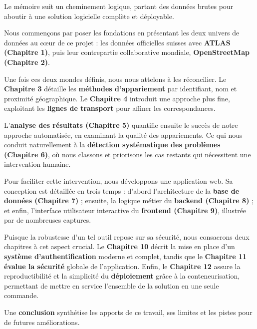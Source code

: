 Le mémoire suit un cheminement logique, partant des données brutes pour aboutir à une solution logicielle complète et déployable. 

Nous commençons par poser les fondations en présentant les deux univers de données au cœur de ce projet : les données officielles suisses avec \textbf{ATLAS (Chapitre 1)}, puis leur contrepartie collaborative mondiale, \textbf{OpenStreetMap (Chapitre 2)}.

Une fois ces deux mondes définis, nous nous attelons à les réconcilier. Le \textbf{Chapitre 3} détaille les \textbf{méthodes d'appariement} par identifiant, nom et proximité géographique. Le \textbf{Chapitre 4} introduit une approche plus fine, exploitant les \textbf{lignes de transport} pour affiner les correspondances.

L'\textbf{analyse des résultats (Chapitre 5)} quantifie ensuite le succès de notre approche automatisée, en examinant la qualité des appariements. Ce qui nous conduit naturellement à la \textbf{détection systématique des problèmes (Chapitre 6)}, où nous classons et priorisons les cas restants qui nécessitent une intervention humaine.

Pour faciliter cette intervention, nous développons une application web. Sa conception est détaillée en trois temps : d'abord l'architecture de la \textbf{base de données (Chapitre 7)} ; ensuite, la logique métier du \textbf{backend (Chapitre 8)} ; et enfin, l'interface utilisateur interactive du \textbf{frontend (Chapitre 9)}, illustrée par de nombreuses captures.

Puisque la robustesse d’un tel outil repose sur sa sécurité, nous consacrons deux chapitres à cet aspect crucial. Le \textbf{Chapitre 10} décrit la mise en place d'un \textbf{système d'authentification} moderne et complet, tandis que le \textbf{Chapitre 11} \textbf{évalue la sécurité} globale de l’application.
Enfin, le \textbf{Chapitre 12} assure la reproductibilité et la simplicité du \textbf{déploiement} grâce à la conteneurisation, permettant de mettre en service l'ensemble de la solution en une seule commande.

Une \textbf{conclusion} synthétise les apports de ce travail, ses limites et les pistes pour de futures améliorations.
